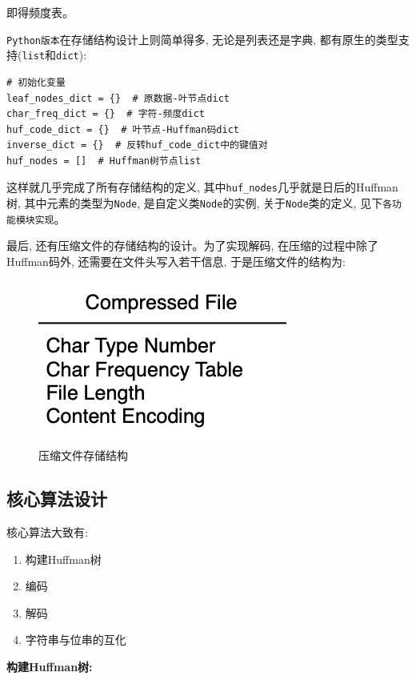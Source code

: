 \documentclass{ctexart}
\begin{document}
即得频度表。

\texttt{Python版本}在存储结构设计上则简单得多, 无论是列表还是字典, 都有原生的类型支持(\texttt{list}和\texttt{dict}):

{\setmainfont{Courier New Bold}              
\begin{lstlisting}
# 初始化变量
leaf_nodes_dict = {}  # 原数据-叶节点dict
char_freq_dict = {}  # 字符-频度dict
huf_code_dict = {}  # 叶节点-Huffman码dict
inverse_dict = {}  # 反转huf_code_dict中的键值对
huf_nodes = []  # Huffman树节点list
\end{lstlisting}}

这样就几乎完成了所有存储结构的定义, 其中\texttt{huf\_nodes}几乎就是日后的Huffman树, 其中元素的类型为\texttt{Node}, 是自定义类\texttt{Node}的实例, 关于\texttt{Node}类的定义, 见下\texttt{各功能模块实现}。

最后, 还有压缩文件的存储结构的设计。为了实现解码, 在压缩的过程中除了Huffman码外, 还需要在文件头写入若干信息, 于是压缩文件的结构为:

\begin{figure}[H]
\centering
\includegraphics[scale=0.6]{../CourseReport/pics/compressed_file.png}
\caption{压缩文件存储结构}
\end{figure}

\subsection{核心算法设计}\label{header-n190}

核心算法大致有:

\begin{enumerate}
\def\labelenumi{\arabic{enumi}.}
\item
  构建Huffman树
\item
  编码
\item
  解码
\item
  字符串与位串的互化
\end{enumerate}

\textbf{构建Huffman树:}
\end{document}

